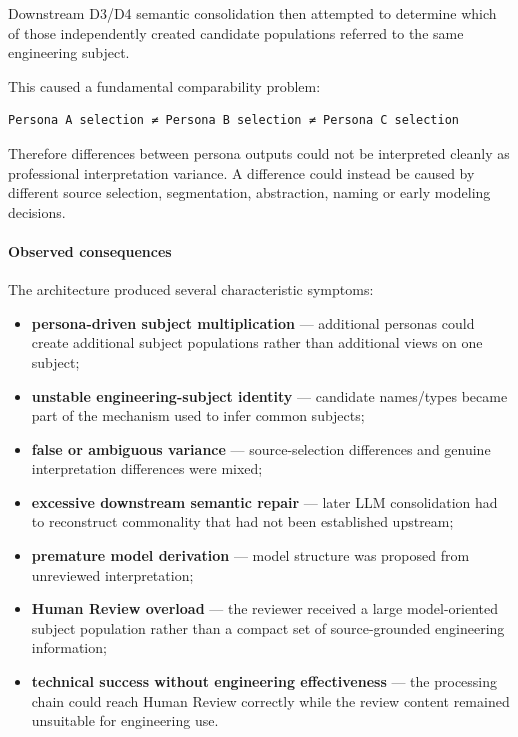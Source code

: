 Downstream D3/D4 semantic consolidation then attempted to determine which of those independently created candidate populations referred to the same engineering subject.

This caused a fundamental comparability problem:

\begin{verbatim}
Persona A selection ≠ Persona B selection ≠ Persona C selection
\end{verbatim}

Therefore differences between persona outputs could not be interpreted cleanly as professional interpretation variance. A difference could instead be caused by different source selection, segmentation, abstraction, naming or early modeling decisions.

\hypertarget{observed-consequences}{%
\paragraph{Observed consequences}\label{observed-consequences}}

The architecture produced several characteristic symptoms:

\begin{itemize}
\tightlist
\item
  \textbf{persona-driven subject multiplication} --- additional personas could create additional subject populations rather than additional views on one subject;
\item
  \textbf{unstable engineering-subject identity} --- candidate names/types became part of the mechanism used to infer common subjects;
\item
  \textbf{false or ambiguous variance} --- source-selection differences and genuine interpretation differences were mixed;
\item
  \textbf{excessive downstream semantic repair} --- later LLM consolidation had to reconstruct commonality that had not been established upstream;
\item
  \textbf{premature model derivation} --- model structure was proposed from unreviewed interpretation;
\item
  \textbf{Human Review overload} --- the reviewer received a large model-oriented subject population rather than a compact set of source-grounded engineering information;
\item
  \textbf{technical success without engineering effectiveness} --- the processing chain could reach Human Review correctly while the review content remained unsuitable for engineering use.
\end{itemize}

